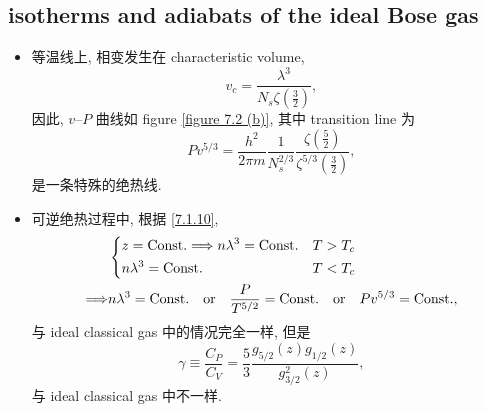 \subsection{isotherms and adiabats of the ideal Bose gas}
\begin{itemize}
	\item 等温线上, 相变发生在 characteristic volume,
	\begin{equation}
		v_c = \frac{\lambda^3}{N_s \zeta(\frac{3}{2})},
	\end{equation}
	因此, $v$--$P$ 曲线如 figure \ref{figure 7.2 (b)}, 其中 transition line 为
	\begin{equation}
		P v^{5 / 3} = \frac{h^2}{2 \pi m} \frac{1}{N_s^{2 / 3}} \frac{\zeta(\frac{5}{2})}{\zeta^{5 / 3}(\frac{3}{2})},
	\end{equation}
	是一条特殊的绝热线.
	
	\item 可逆绝热过程中, 根据 \eqref{7.1.10},
	\begin{align}
		& \begin{dcases}
			z = \text{Const.} \Longrightarrow n \lambda^3 = \text{Const.} & T > T_c \\
			n \lambda^3 = \text{Const.} & T < T_c
		\end{dcases} \notag \\
		\Longrightarrow & n \lambda^3 = \text{Const.} \quad \text{or} \quad \frac{P}{T^{5 / 2}} = \text{Const.} \quad \text{or} \quad P v^{5 / 3} = \text{Const.},
	\end{align}
	与 ideal classical gas 中的情况完全一样, 但是
	\begin{equation}
		\gamma \equiv \frac{C_P}{C_V} = \frac{5}{3} \frac{g_{5 / 2}(z) g_{1 / 2}(z)}{g_{3 / 2}^2(z)},
	\end{equation}
	与 ideal classical gas 中不一样.
\end{itemize}

